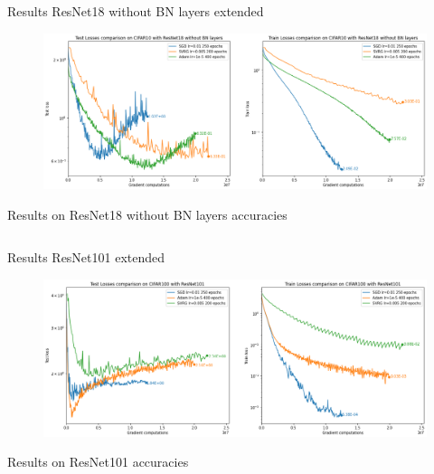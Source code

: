 \documentclass[10pt]{beamer}
\begin{document}
\begin{frame}{Results ResNet18 without BN layers extended}
    \begin{figure}
        \centering
        \includegraphics[width=\textwidth]{report/figures/CIFAR10noBN.png}
    \end{figure}
\end{frame}

\begin{frame}{Results on ResNet18 without BN layers accuracies}
    \begin{table}[h]
    \begin{center}
        \begin{tabular}{||c | c | c||}
             \hline
             
        \end{tabular}
    \end{center}
    \end{table}
\end{frame}

\begin{frame}{Results ResNet101 extended}
    \begin{figure}
        \centering
        \includegraphics[width=\textwidth]{report/figures/CIFAR100.png}
    \end{figure}
\end{frame}

\begin{frame}{Results on ResNet101 accuracies}
    \begin{table}[h]
    \begin{center}
        \begin{tabular}{||c | c | c||}
             \hline
             
        \end{tabular}
    \end{center}
    \end{table}
\end{frame}
\end{document}
